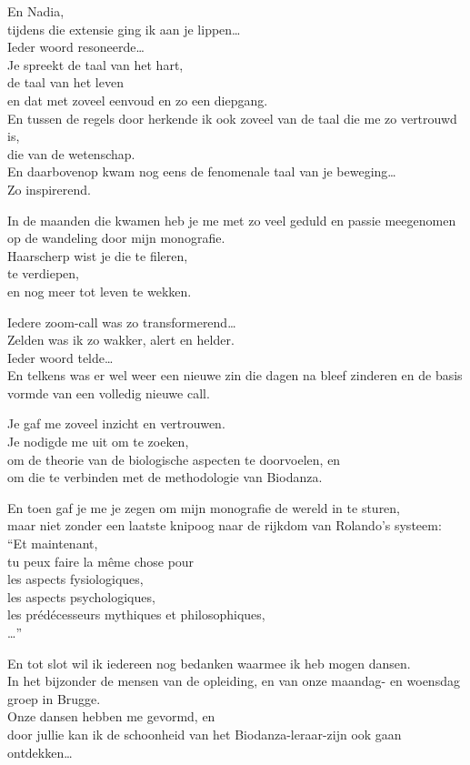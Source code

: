\documentclass[
  11pt,
]{book}
\begin{document}
En Nadia,\\
tijdens die extensie ging ik aan je lippen\ldots{}\\
Ieder woord resoneerde\ldots{}\\
Je spreekt de taal van het hart,\\
de taal van het leven\\
en dat met zoveel eenvoud en zo een diepgang.\\
En tussen de regels door
herkende ik ook zoveel van
de taal die me zo vertrouwd is,\\
die van de wetenschap.\\
En daarbovenop kwam nog eens de fenomenale taal van je beweging\ldots{}\\
Zo inspirerend.

In de maanden die kwamen heb je me met zo veel geduld en passie
meegenomen op de wandeling door mijn monografie.\\
Haarscherp wist je die te fileren,\\
te verdiepen,\\
en nog meer tot leven te wekken.

Iedere zoom-call was zo transformerend\ldots{}\\
Zelden was ik zo wakker, alert en helder.\\
Ieder woord telde\ldots{}\\
En telkens was er wel weer een nieuwe zin die dagen na bleef zinderen en de basis vormde van een volledig nieuwe call.

Je gaf me zoveel inzicht en vertrouwen.\\
Je nodigde me uit om te zoeken,\\
om de theorie van de biologische aspecten te doorvoelen, en\\
om die te verbinden met de methodologie van Biodanza.

En toen gaf je me je zegen om mijn monografie de wereld in te sturen,\\
maar niet zonder een laatste knipoog naar de rijkdom van Rolando's systeem:\\
``Et maintenant,\\
tu peux faire la même chose pour\\
les aspects fysiologiques,\\
les aspects psychologiques,\\
les prédécesseurs mythiques et philosophiques,\\
\ldots{}''

En tot slot wil ik iedereen nog bedanken waarmee ik heb mogen dansen.\\
In het bijzonder de mensen van de opleiding, en van onze maandag- en woensdag groep in Brugge.\\
Onze dansen hebben me gevormd, en\\
door jullie kan ik de schoonheid van het Biodanza-leraar-zijn ook gaan ontdekken\ldots{}
\end{document}
